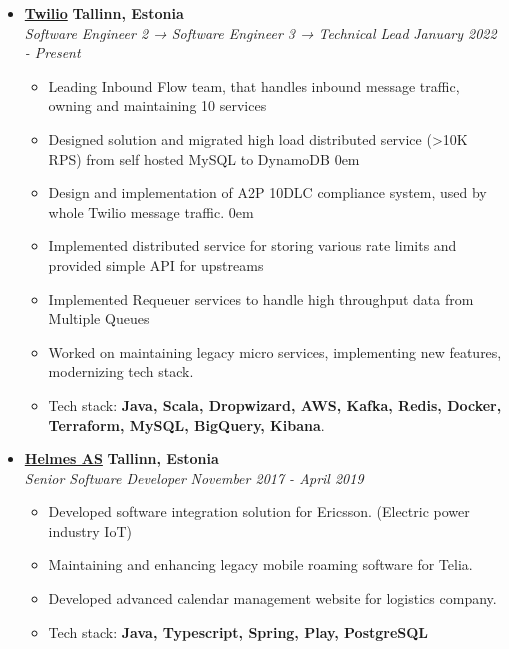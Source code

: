 \documentclass[10pt,letterpaper]{article}
\begin{document}
  \begin{itemize}
    \parskip=-0.5em
    
         \item[]
    {\href{https://www.twilio.com/}{\textbf{Twilio}} \hfill
      \textbf{Tallinn, Estonia}}
    \\
    {\emph{Software Engineer 2 → Software Engineer 3 → Technical Lead} \hfill \emph{January 2022 - Present}}
    \begin{itemize}[label=\textbullet]
      \itemsep0em
      \item Leading Inbound Flow team, that handles inbound message traffic, owning and maintaining 10 services
      \item Designed solution and migrated high load distributed service (>10K RPS) from self hosted MySQL to DynamoDB
      \itemsep0em
      \item Design and implementation of A2P 10DLC compliance system, used by whole Twilio message traffic.
      \itemsep0em
      \item Implemented distributed service for storing various rate limits and provided simple API for upstreams
      \item Implemented Requeuer services to handle high throughput data from Multiple Queues
      \item Worked on maintaining legacy micro services, implementing new features, modernizing tech stack.
      \item {Tech stack: \textbf{Java, Scala, Dropwizard, AWS, Kafka, Redis, Docker, Terraform, MySQL, BigQuery, Kibana}.}
    \end{itemize}
    \hfill \break
    
    \item[]
    {\href{https://www.helmes.com/}{\textbf{Helmes AS}} \hfill
      \textbf{Tallinn, Estonia}}
    \\
    {\emph{Senior Software Developer} \hfill \emph{November 2017 - April 2019}}

    \begin{itemize}[label=\textbullet]
      \itemsep0em
      \item Developed software integration solution for Ericsson. (Electric power industry IoT)
      \item Maintaining and enhancing legacy mobile roaming software for Telia.
      \item Developed advanced calendar management website for logistics company.
      \item {Tech stack: \textbf{Java, Typescript, Spring, Play, PostgreSQL}}
    \end{itemize}
    \hfill \break
    

\end{itemize}
\end{document}
